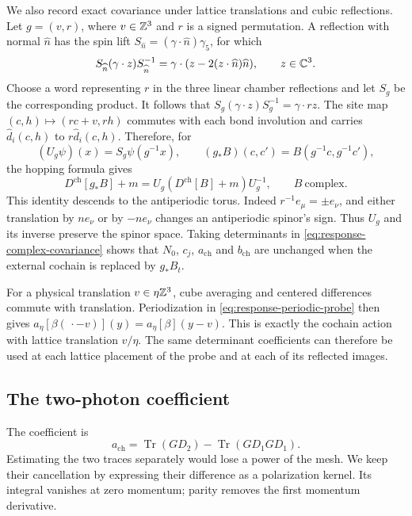 We also record exact covariance under lattice translations and cubic
reflections. Let $g=(v,r)$, where $v\in\mathbb Z^3$ and $r$ is a signed
permutation. A reflection with normal $\widehat n$ has the spin lift
$S_{\widehat n}=(\gamma\cdot\widehat n)\gamma_5$, for which
\[
 S_{\widehat n}(\gamma\cdot z)S_{\widehat n}^{-1}
       =\gamma\cdot(z-2(z\cdot\widehat n)\widehat n),
                         \qquad z\in\mathbb C^3.
\]
Choose a word representing $r$ in the three linear chamber
reflections and let $S_g$ be the corresponding product. It follows
that $S_g(\gamma\cdot z)S_g^{-1}=\gamma\cdot rz$.
The site map $(c,h)\mapsto(rc+v,rh)$ commutes with each bond
involution and carries $\widehat d_i(c,h)$ to
$r\widehat d_i(c,h)$. Therefore, for
\[
 (U_g\psi)(x)=S_g\psi(g^{-1}x),\qquad
 (g_*B)(c,c')=B(g^{-1}c,g^{-1}c'),
\]
the hopping formula gives
\begin{equation}\label{eq:response-complex-covariance}
 D^{\mathrm{ch}}[g_*B]+m
       =U_g(D^{\mathrm{ch}}[B]+m)U_g^{-1},
                                             \qquad B\ \text{complex}.
\end{equation}
This identity descends to the antiperiodic torus. Indeed
$r^{-1}e_\mu=\pm e_\nu$, and either translation by $ne_\nu$
or by $-ne_\nu$ changes an antiperiodic spinor's sign.
Thus $U_g$ and its inverse preserve the spinor space.
Taking determinants in \eqref{eq:response-complex-covariance}
shows that $N_0$, $c_j$, $a_{\mathrm{ch}}$ and $b_{\mathrm{ch}}$
are unchanged when the external cochain is replaced by $g_*B_t$.

For a physical translation $v\in\eta\mathbb Z^3$, cube averaging and
centered differences commute with translation. Periodization in
\eqref{eq:response-periodic-probe} then gives
$a_\eta[\beta(\,\cdot-v)](y)=a_\eta[\beta](y-v)$.
This is exactly the cochain action with lattice translation $v/\eta$.
The same determinant coefficients can therefore be used at each
lattice placement of the probe and at each of its reflected images.

\subsection{The two-photon coefficient}\label{subsec:response-polarization}

The coefficient is
\[
 a_{\mathrm{ch}}=\operatorname{Tr}(GD_2)-
                     \operatorname{Tr}(GD_1GD_1).
\]
Estimating the two traces separately would lose a power of the mesh.
We keep their cancellation by expressing their difference
as a polarization kernel. Its integral vanishes at zero momentum;
parity removes the first momentum derivative.

